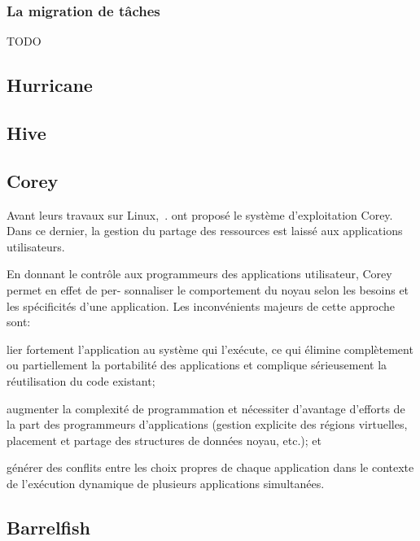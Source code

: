       \subsubsection{La migration de tâches}

        TODO

    \subsection{Hurricane}

    \subsection{Hive}

    \subsection{Corey}

      Avant leurs travaux sur Linux,~\citet{boyd2008corey}. ont proposé le
      système d’exploitation Corey. Dans ce dernier, la gestion du partage des
      ressources est laissé aux applications utilisateurs.

      En donnant le contrôle aux programmeurs des applications utilisateur,
      Corey permet en effet de per- sonnaliser le comportement du noyau selon
      les besoins et les spécificités d’une application. Les inconvénients
      majeurs de cette approche sont: \benumline \item lier fortement l’application au
      système qui l’exécute, ce qui élimine complètement ou partiellement la
      portabilité des applications et complique sérieusement la réutilisation du
      code existant;\item augmenter la complexité de programmation et
      nécessiter d’avantage d’efforts de la part des programmeurs d’applications
      (gestion explicite des régions virtuelles, placement et partage des
      structures de données noyau, etc.); et \item  générer des conflits entre
      les choix propres de chaque application dans le contexte de l’exécution
      dynamique de plusieurs applications simultanées\eenumline.


    \subsection{Barrelfish}
      

